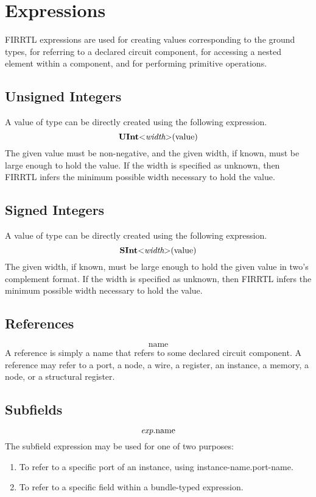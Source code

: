\documentclass[12pt]{article}
\begin{document}
\section{Expressions}

FIRRTL expressions are used for creating values corresponding to the ground types, for referring to a declared circuit component, for accessing a nested element within a component, and for performing primitive operations. 

\subsection{Unsigned Integers}

A value of type  can be directly created using the following expression.
\[
\text{\bf UInt}\text{\bf $<$} \text{\em width} \text{\bf $>$}(\text{value})
\]
The given value must be non-negative, and the given width, if known, must be large enough to hold the value.
If the width is specified as unknown, then FIRRTL infers the minimum possible width necessary to hold the value.

\subsection{Signed Integers}

A value of type  can be directly created using the following expression.
\[
\text{\bf SInt}\text{\bf $<$} \text{\em width} \text{\bf $>$}(\text{value})
\]
The given width, if known, must be large enough to hold the given value in two's complement format.
If the width is specified as unknown, then FIRRTL infers the minimum possible width necessary to hold the value.

\subsection{References}
\[
\text{name}
\]
A reference is simply a name that refers to some declared circuit component.
A reference may refer to a port, a node, a wire, a register, an instance, a memory, a node, or a structural register.

\subsection{Subfields}
\[
\text{\em exp}.\text{name}
\]
The subfield expression may be used for one of two purposes:
\begin{enumerate}
\item To refer to a specific port of an instance, using instance-name.port-name. 
\item To refer to a specific field within a bundle-typed expression.
\end{enumerate}
\end{document}
